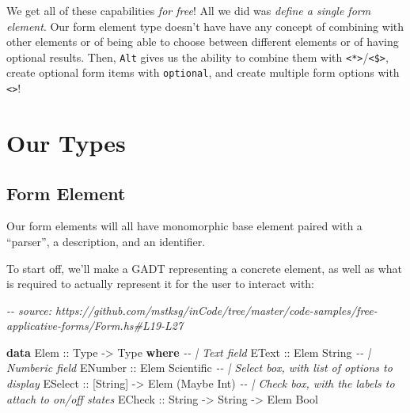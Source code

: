 \documentclass[]{article}
\newenvironment{Shaded}{}{}
\newcommand{\CommentTok}[1]{\textcolor[rgb]{0.38,0.63,0.69}{\textit{#1}}}
\newcommand{\DataTypeTok}[1]{\textcolor[rgb]{0.56,0.13,0.00}{#1}}
\newcommand{\KeywordTok}[1]{\textcolor[rgb]{0.00,0.44,0.13}{\textbf{#1}}}
\newcommand{\NormalTok}[1]{#1}
\newcommand{\OtherTok}[1]{\textcolor[rgb]{0.00,0.44,0.13}{#1}}
\begin{document}
We get all of these capabilities \emph{for free}! All we did was \emph{define a
single form element}. Our form element type doesn't have have any concept of
combining with other elements or of being able to choose between different
elements or of having optional results. Then, \texttt{Alt} gives us the ability
to combine them with
\texttt{\textless{}*\textgreater{}}/\texttt{\textless{}\$\textgreater{}}, create
optional form items with \texttt{optional}, and create multiple form options
with \texttt{\textless{}\textbar{}\textgreater{}}!

\hypertarget{our-types}{%
\section{Our Types}\label{our-types}}

\hypertarget{form-element}{%
\subsection{Form Element}\label{form-element}}

Our form elements will all have monomorphic base element paired with a
``parser'', a description, and an identifier.

To start off, we'll make a GADT representing a concrete element, as well as what
is required to actually represent it for the user to interact with:

\begin{Shaded}
\begin{Highlighting}[]
\CommentTok{{-}{-} source: https://github.com/mstksg/inCode/tree/master/code{-}samples/free{-}applicative{-}forms/Form.hs\#L19{-}L27}

\KeywordTok{data} \DataTypeTok{Elem}\OtherTok{ ::} \DataTypeTok{Type} \OtherTok{{-}>} \DataTypeTok{Type} \KeywordTok{where}
    \CommentTok{{-}{-} | Text field}
    \DataTypeTok{EText}\OtherTok{   ::} \DataTypeTok{Elem} \DataTypeTok{String}
    \CommentTok{{-}{-} | Numberic field}
    \DataTypeTok{ENumber}\OtherTok{ ::} \DataTypeTok{Elem} \DataTypeTok{Scientific}
    \CommentTok{{-}{-} | Select box, with list of options to display}
    \DataTypeTok{ESelect}\OtherTok{ ::}\NormalTok{ [}\DataTypeTok{String}\NormalTok{] }\OtherTok{{-}>} \DataTypeTok{Elem}\NormalTok{ (}\DataTypeTok{Maybe} \DataTypeTok{Int}\NormalTok{)}
    \CommentTok{{-}{-} | Check box, with the labels to attach to on/off states}
    \DataTypeTok{ECheck}\OtherTok{  ::} \DataTypeTok{String} \OtherTok{{-}>} \DataTypeTok{String} \OtherTok{{-}>} \DataTypeTok{Elem} \DataTypeTok{Bool}
\end{Highlighting}
\end{Shaded}
\end{document}
